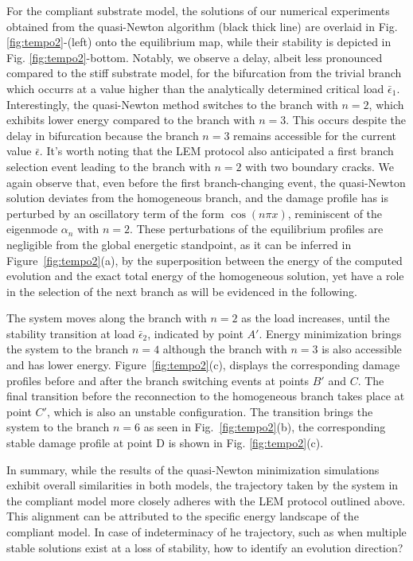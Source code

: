 \documentclass[10pt]{article}
\begin{document}
%
For the compliant substrate model, the solutions of our numerical experiments obtained from the quasi-Newton algorithm (black thick line) are overlaid in Fig. \ref{fig:tempo2}-(left) onto the equilibrium map, while their stability is depicted in Fig. \ref{fig:tempo2}-bottom. Notably, we observe a delay, albeit less pronounced compared to the stiff substrate model, for the bifurcation from the trivial branch which occurrs at a value  higher than the analytically determined critical load \(\bar{\epsilon}_1\). Interestingly, the quasi-Newton method switches to the branch with $n=2$, which exhibits lower energy compared to the branch with $n=3$. This occurs  despite the delay in bifurcation because the branch  $n=3$ remains accessible for the current value $\bar\epsilon$. It's worth noting that the LEM protocol also anticipated a first branch selection event leading to the branch with $n=2$ with two boundary cracks. 
We again observe that, even before the first branch-changing event, the quasi-Newton solution {deviates from the homogeneous branch, and the damage profile has} is perturbed by an oscillatory term of the form \(\cos(n\pi x)\), reminiscent of the eigenmode $\alpha_n$  with \(n=2\). 
%
These perturbations of the equilibrium profiles are negligible from the global energetic standpoint, as it can be inferred in Figure~\ref{fig:tempo2}(a), by the superposition between the energy of the computed evolution and the exact total energy of the homogeneous solution, yet have a role in the selection of the next branch as will be evidenced in the following.

The system moves along the branch with $n=2$  as the load increases, until the stability transition at load $\bar \epsilon_2$, indicated by point $A'$. Energy minimization brings the system to the branch $n=4$ although the branch with $n=3$ is also accessible and has lower energy. Figure~\ref{fig:tempo2}(c), displays the corresponding damage profiles before and after {the branch} switching events  at points $B'$ and $C$. The final {transition} before the reconnection to the homogeneous branch takes place at point $C'$, which is also an unstable configuration. The transition brings the system to the branch $n=6$ as seen in Fig.~\ref{fig:tempo2}(b), the corresponding stable damage profile at point D is shown in Fig. \ref{fig:tempo2}(c). 

In summary, while the results of the quasi-Newton minimization simulations exhibit overall similarities in both models, the trajectory taken by the system in the compliant model more closely adheres with the LEM protocol outlined above. This alignment can be attributed to the specific energy landscape of the compliant model. In case of indeterminacy of he trajectory, such as when multiple stable solutions exist at a loss of stability, how to identify an evolution direction?
\end{document}
